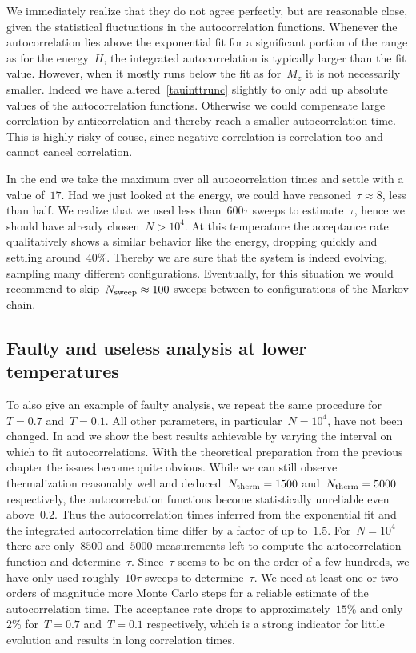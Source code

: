 We immediately realize that they do not agree perfectly, but are reasonable
close, given the statistical fluctuations in the autocorrelation functions.
Whenever the autocorrelation lies above the exponential fit for a significant
portion of the range as for the energy~$H$, the integrated autocorrelation is
typically larger than the fit value. However, when it mostly runs below the fit
as for~$M_z$ it is not necessarily smaller. Indeed we have
altered~\eqref{tauinttrunc} slightly to only add up absolute values of the
autocorrelation functions. Otherwise we could compensate large correlation by
anticorrelation and thereby reach a smaller autocorrelation time. This is highly
risky of couse, since negative correlation is correlation too and cannot cancel
correlation.

In the end we take the maximum over all autocorrelation times and settle with a
value of~$17$. Had we just looked at the energy, we could have reasoned~$\tau
\approx 8$, less than half. We realize that we used less than~$600 \tau$ sweeps
to estimate~$\tau$, hence we should have already chosen~$N > 10^4$. At this
temperature the acceptance rate qualitatively shows a similar behavior like the
energy, dropping quickly and settling around~$40$\%. Thereby we are sure that
the system is indeed evolving, sampling many different configurations.
Eventually, for this situation we would recommend to skip~$N_{\mathrm{sweep}} \approx 100$
sweeps between to configurations of the Markov chain.

\subsection{Faulty and useless analysis at lower temperatures}

To also give an example of faulty analysis, we repeat the same procedure
for~$T=0.7$ and~$T=0.1$. All other parameters, in particular~$N=10^4$, have not
been changed. In  and  we show the best
results achievable by varying the interval on which to fit autocorrelations.
With the theoretical preparation from the previous chapter the issues become
quite obvious. While we can still observe thermalization reasonably well and
deduced~$N_{\mathrm{therm}}=1500$ and~$N_{\mathrm{therm}}=5000$ respectively, the autocorrelation
functions become statistically unreliable even above~$0.2$. Thus the
autocorrelation times inferred from the exponential fit and the integrated
autocorrelation time differ by a factor of up to~$1.5$. For~$N=10^4$ there are
only~$8500$ and~$5000$ measurements left to compute the autocorrelation function
and determine~$\tau$. Since~$\tau$ seems to be on the order of a few hundreds,
we have only used roughly~$10 \tau$ sweeps to determine~$\tau$. We need at least
one or two orders of magnitude more Monte Carlo steps for a reliable estimate of
the autocorrelation time. The acceptance rate drops to approximately~$15$\% and
only~$2$\% for~$T=0.7$ and~$T=0.1$ respectively, which is a strong indicator for
little evolution and results in long correlation times.

